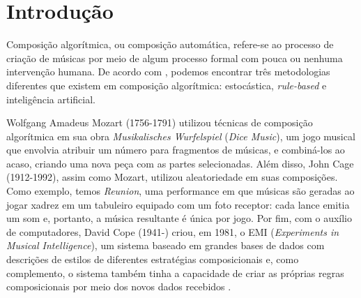\documentclass{automatextcc}
\begin{document}
\listoffigures

\listoftables


\chapter{Introdução}


Composição algorítmica, ou composição automática, refere-se ao processo de criação de músicas por meio de algum processo formal com pouca ou nenhuma intervenção humana. De acordo com \citet{maurer}, podemos encontrar três metodologias diferentes que existem em composição algorítmica: estocástica, \textit{rule-based} e inteligência artificial.

Wolfgang Amadeus Mozart (1756-1791) utilizou técnicas de composição algorítmica em sua obra \textit{Musikalisches Wurfelspiel} (\textit{Dice Music}), um jogo musical que envolvia atribuir um número para fragmentos de músicas, e combiná-los ao acaso, criando uma nova peça com as partes selecionadas. Além disso, John Cage (1912-1992), assim como Mozart, utilizou aleatoriedade em suas composições. Como exemplo, temos \textit{Reunion}, uma performance em que músicas são geradas ao jogar xadrez em um tabuleiro equipado com um foto receptor: cada lance emitia um som e, portanto, a música resultante é única por jogo. Por fim, com o auxílio de computadores, David Cope (1941-) criou, em 1981, o EMI (\textit{Experiments in Musical Intelligence}), um sistema baseado em grandes bases de dados com descrições de estilos de diferentes estratégias composicionais e, como complemento, o sistema também tinha a capacidade de criar as próprias regras composicionais por meio dos novos dados recebidos \citep{alpern1995, maurer}. 



\end{document}
